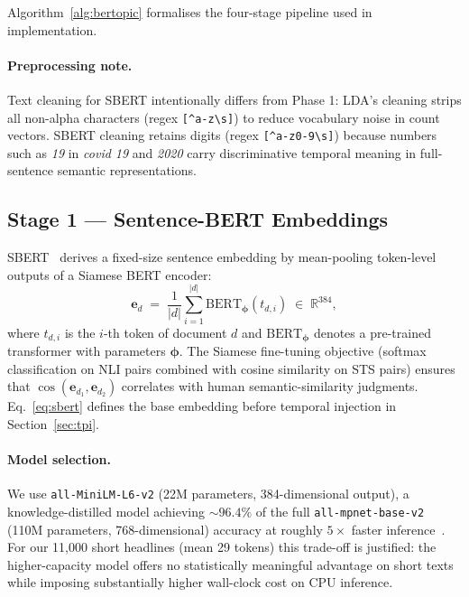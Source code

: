 \documentclass[10pt,twocolumn,a4paper]{article}
\newcommand{\R}{\mathbb{R}}
\begin{document}
Algorithm~\ref{alg:bertopic} formalises the four-stage pipeline used in implementation.

\paragraph{Preprocessing note.} Text cleaning for SBERT intentionally differs from Phase 1: LDA's cleaning strips all non-alpha characters (regex \verb|[^a-z\s]|) to reduce vocabulary noise in count vectors. SBERT cleaning retains digits (regex \verb|[^a-z0-9\s]|) because numbers such as \emph{19} in \emph{covid 19} and \emph{2020} carry discriminative temporal meaning in full-sentence semantic representations.

\subsection{Stage 1 --- Sentence-BERT Embeddings}
\label{sec:sbert}

SBERT~\cite{reimers2019} derives a fixed-size sentence embedding by mean-pooling token-level outputs of a Siamese BERT encoder:
\begin{equation}
\label{eq:sbert}
\bm{e}_d \;=\; \frac{1}{|d|}\sum_{i=1}^{|d|} \mathrm{BERT}_{\boldsymbol{\phi}}(t_{d,i}) \;\in\; \R^{384},
\end{equation}
where $t_{d,i}$ is the $i$-th token of document $d$ and $\mathrm{BERT}_{\boldsymbol{\phi}}$ denotes a pre-trained transformer with parameters $\boldsymbol{\phi}$. The Siamese fine-tuning objective (softmax classification on NLI pairs combined with cosine similarity on STS pairs) ensures that $\cos(\bm{e}_{d_1}, \bm{e}_{d_2})$ correlates with human semantic-similarity judgments.
Eq.~\eqref{eq:sbert} defines the base embedding before temporal injection in Section~\ref{sec:tpi}.

\paragraph{Model selection.} We use \texttt{all-MiniLM-L6-v2} (22M parameters, 384-dimensional output), a knowledge-distilled model achieving $\sim 96.4\%$ of the full \texttt{all-mpnet-base-v2} (110M parameters, 768-dimensional) accuracy at roughly $5\times$ faster inference~\cite{reimers2019}. For our 11{,}000 short headlines (mean 29 tokens) this trade-off is justified: the higher-capacity model offers no statistically meaningful advantage on short texts while imposing substantially higher wall-clock cost on CPU inference.
\end{document}
